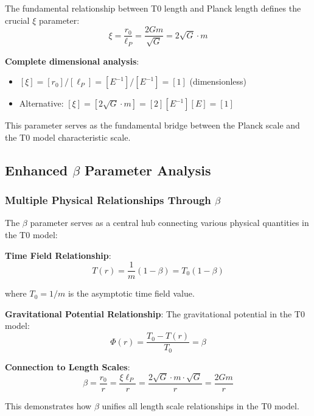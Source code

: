 \documentclass[12pt,a4paper]{article}
\begin{document}
The fundamental relationship between T0 length and Planck length defines the crucial $\xi$ parameter:
\begin{equation}
	\boxed{\xi = \frac{r_0}{\ell_P} = \frac{2Gm}{\sqrt{G}} = 2\sqrt{G} \cdot m}
\end{equation}

\textbf{Complete dimensional analysis}:
\begin{itemize}
	\item $[\xi] = [r_0]/[\ell_P] = [E^{-1}]/[E^{-1}] = [1]$ (dimensionless) \checkmark
	\item Alternative: $[\xi] = [2\sqrt{G} \cdot m] = [2][E^{-1}][E] = [1]$ \checkmark
\end{itemize}

This parameter serves as the fundamental bridge between the Planck scale and the T0 model characteristic scale.

\subsection{Enhanced $\beta$ Parameter Analysis}
\label{subsec:beta_enhanced_analysis}

\subsubsection{Multiple Physical Relationships Through $\beta$}
\label{subsubsec:beta_multiple_relationships}

The $\beta$ parameter serves as a central hub connecting various physical quantities in the T0 model:

\textbf{Time Field Relationship}:
\begin{equation}
	T(r) = \frac{1}{m}(1 - \beta) = T_0(1 - \beta)
\end{equation}

where $T_0 = 1/m$ is the asymptotic time field value.

\textbf{Gravitational Potential Relationship}:
The gravitational potential in the T0 model:
\begin{equation}
	\Phi(r) = \frac{T_0 - T(r)}{T_0} = \beta
\end{equation}

\textbf{Connection to Length Scales}:
\begin{equation}
	\beta = \frac{r_0}{r} = \frac{\xi \ell_P}{r} = \frac{2\sqrt{G} \cdot m \cdot \sqrt{G}}{r} = \frac{2Gm}{r}
\end{equation}

This demonstrates how $\beta$ unifies all length scale relationships in the T0 model.
\end{document}
